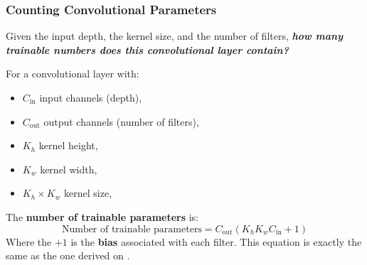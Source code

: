 \subsubsection{Counting Convolutional Parameters}\label{sec:counting-convolutional-parameters}

Given the input depth, the kernel size, and the number of filters, \emph{\textbf{how many trainable numbers does this convolutional layer contain?}}

\highspace
For a convolutional layer with:
\begin{itemize}
    \item $C_{\text{in}}$ input channels (depth),
    \item $C_{\text{out}}$ output channels (number of filters),
    \item $K_h$ kernel height,
    \item $K_w$ kernel width,
    \item $K_h \times K_w$ kernel size,
\end{itemize}
The \textbf{number of trainable parameters} is:
\begin{equation}\label{eq:number-of-trainable-parameters-for-n-filters}
    \text{Number of trainable parameters} = C_{\text{out}} \left( K_h K_w C_{\text{in}} + 1 \right)
\end{equation}
Where the $+1$ is the \textbf{bias} associated with each filter. This equation is exactly the same as the one derived on .

